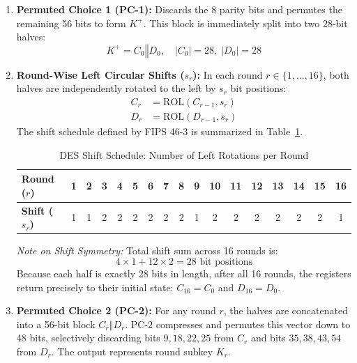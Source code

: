 \documentclass[12pt,a4paper]{article}
\begin{document}
\begin{enumerate}
    \item \textbf{Permuted Choice 1 (PC-1):} Discards the 8 parity bits and permutes the remaining 56 bits to form $K^+$. This block is immediately split into two 28-bit halves:
    \begin{equation}
        K^+ = C_0 \mathbin{\Vert} D_0, \quad |C_0| = 28, \; |D_0| = 28
    \end{equation}
    \item \textbf{Round-Wise Left Circular Shifts ($s_r$):} In each round $r \in \{1, \dots, 16\}$, both halves are independently rotated to the left by $s_r$ bit positions:
    \begin{align}
        C_r &= \text{ROL}(C_{r-1}, s_r) \\
        D_r &= \text{ROL}(D_{r-1}, s_r)
    \end{align}
    The shift schedule defined by FIPS 46-3 is summarized in Table~\ref{tab:shifts}.

    \begin{table}[h!]
        \centering
        \caption{DES Shift Schedule: Number of Left Rotations per Round}
        \label{tab:shifts}
        \begin{tabular}{@{}lcccccccccccccccc@{}}
            \toprule
            \textbf{Round ($r$)} & \textbf{1} & \textbf{2} & \textbf{3} & \textbf{4} & \textbf{5} & \textbf{6} & \textbf{7} & \textbf{8} & \textbf{9} & \textbf{10} & \textbf{11} & \textbf{12} & \textbf{13} & \textbf{14} & \textbf{15} & \textbf{16} \\ \midrule
            \textbf{Shift ($s_r$)} & 1 & 1 & 2 & 2 & 2 & 2 & 2 & 2 & 1 & 2 & 2 & 2 & 2 & 2 & 2 & 1 \\ \bottomrule
        \end{tabular}
    \end{table}

    \textit{Note on Shift Symmetry:} Total shift sum across 16 rounds is:
    \begin{equation}
        4 \times 1 + 12 \times 2 = 28 \text{ bit positions}
    \end{equation}
    Because each half is exactly 28 bits in length, after all 16 rounds, the registers return precisely to their initial state: $C_{16} = C_0$ and $D_{16} = D_0$.

    \item \textbf{Permuted Choice 2 (PC-2):} For any round $r$, the halves are concatenated into a 56-bit block $C_r \mathbin{\Vert} D_r$. PC-2 compresses and permutes this vector down to 48 bits, selectively discarding bits $9, 18, 22, 25$ from $C_r$ and bits $35, 38, 43, 54$ from $D_r$. The output represents round subkey $K_r$.
\end{enumerate}
\end{document}

